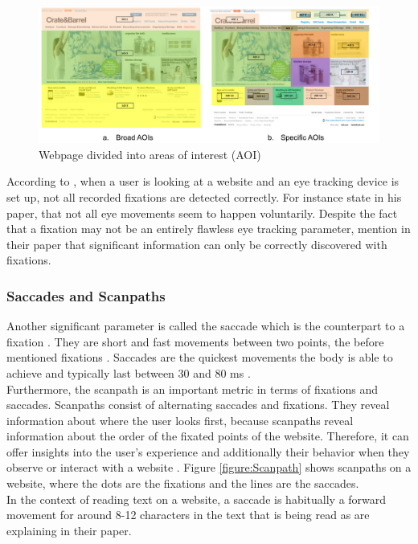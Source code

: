 \begin{figure}[t]
    \centering
    \includegraphics[width=0.75\linewidth]{images/AOI_djamasbi2014eye.png}
    \caption{
        Webpage divided into areas of interest (AOI) \autocite[48]{djamasbi2014eye}
    }
    \label{figure:AOI}
\end{figure}

According to \textcite[]{grzyb2016eye}, when a user is looking at a website and an eye tracking device is set up, not all recorded fixations are detected correctly.
For instance \textcite[]{bruneau2002eyes} state in his paper, that not all eye movements seem to happen voluntarily. 
Despite the fact that a fixation may not be an entirely flawless eye tracking parameter, \textcite[]{biedert2010eyebook} mention in their paper that significant information can only be correctly discovered with fixations.

\subsubsection{Saccades and Scanpaths}
Another significant parameter is called the saccade which is the counterpart to a fixation \autocite{goldberg2003eye}. They are short and fast movements between two points, the before mentioned fixations \autocite{goldberg2003eye, beymer2007eye}. Saccades are the quickest movements the body is able to achieve and typically last between 30 and 80 ms \autocite[]{blascheck2014state}. \\
Furthermore, the scanpath is an important metric in terms of fixations and saccades. Scanpaths consist of alternating saccades and fixations. They reveal information about where the user looks first, because scanpaths reveal information about the order of the fixated points of the website. Therefore, it can offer insights into the user's experience and additionally their behavior when they observe or interact with a website \autocite[]{lorigo2008eye, blascheck2014state}. Figure \ref{figure:Scanpath} shows scanpaths on a website, where the dots are the fixations and the lines are the saccades. \\
In the context of reading text on a website, a saccade is habitually a forward movement for around 8-12 characters in the text that is being read as \textcite[]{beymer2007eye} are explaining in their paper.

